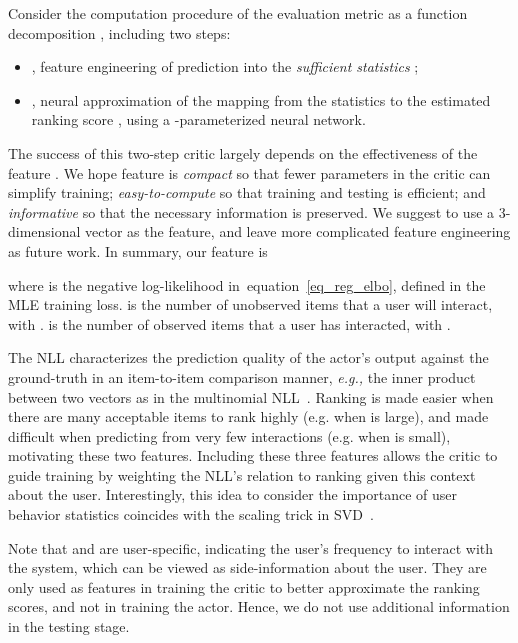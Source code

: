\documentclass{article} \usepackage{iclr2020_conference,times}
\def\eqref#1{equation~\ref{#1}}
\newcommand{\eg}[0]{\emph{e.g., }}
\begin{document}
Consider the computation procedure of the evaluation metric as a function decomposition , including two steps:


\vspace{-2mm}
\begin{itemize} 
		\item
	    , feature engineering of prediction  into the {\it sufficient statistics}  ; 
		\item 
		, neural approximation of the mapping from the statistics  to the estimated ranking score , using a -parameterized neural network.
\end{itemize}

The success of this two-step critic largely depends on the effectiveness of the feature . We hope feature  is   {\it compact} so that fewer parameters in the critic  can simplify training;  {\it easy-to-compute} so that training and testing is efficient; and   {\it informative} so that the necessary information is preserved. 
We suggest to use a 3-dimensional vector as the feature, and leave more complicated feature engineering as future work. In summary, our feature is 

where
   is the negative log-likelihood in~\eqref{eq_reg_elbo}, defined in the MLE training loss.
   is the number of unobserved items that a user will interact, with . 
   is the number of observed items that a user has interacted, with . 


The NLL characterizes the prediction quality of the actor's output  against the ground-truth  in an item-to-item comparison manner, \eg the inner product between two vectors  as in the multinomial NLL~\citep{liang2018variational}. Ranking is made easier when there are many acceptable items to rank highly (e.g. when  is large), and made difficult when predicting from very few interactions (e.g. when  is small), motivating these two features. Including these three features allows the critic to guide training by weighting the NLL's relation to ranking given this context about the user. Interestingly, this idea to consider the importance of user behavior statistics coincides with the scaling trick in SVD~\citep{nikolakopoulos2019eigenrec}.







Note that  and  are user-specific, indicating the user's frequency to interact with the system, which can be viewed as side-information about the user. They are only used as features in training the critic to better approximate the ranking scores, and not in training the actor. Hence, we do not use additional information in the testing stage.
\end{document}
